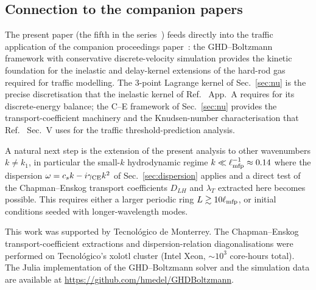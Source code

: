 \documentclass[aps,pre,twocolumn,superscriptaddress,longbibliography,floatfix]{revtex4-2}
\begin{document}
\subsection{Connection to the companion papers}

The present paper (the fifth in the
series~\cite{PaperI,PaperII,PaperIII,PaperIV}) feeds
directly into the traffic application of the companion
proceedings paper~\cite{PaperVI}: the GHD--Boltzmann framework with
conservative discrete-velocity simulation provides the
kinetic foundation for the inelastic and delay-kernel
extensions of the hard-rod gas required for traffic
modelling. The 3-point Lagrange kernel of
Sec.~\ref{sec:nu} is the precise discretisation that the
inelastic kernel of Ref.~\cite{PaperVI} App.~A requires for
its discrete-energy balance; the C--E framework of
Sec.~\ref{sec:nu} provides the transport-coefficient
machinery and the Knudsen-number characterisation that
Ref.~\cite{PaperVI} Sec.~V uses for the traffic
threshold-prediction analysis.

A natural next step is the extension of the present
analysis to other wavenumbers $k\ne k_1$, in particular the
small-$k$ hydrodynamic regime
$k\ll\ell_{\rm mfp}^{-1}\approx 0.14$ where the dispersion
$\omega=c_s k-i\gamma_{\rm CE}k^2$ of
Sec.~\ref{sec:dispersion} applies and a direct test of the
Chapman--Enskog transport coefficients $D_{LH}$ and
$\lambda_T$ extracted here becomes possible. This requires
either a larger periodic ring $L\gtrsim 10\ell_{\rm mfp}$,
or initial conditions seeded with longer-wavelength
modes.

\begin{acknowledgments}
This work was supported by Tecnol\'ogico de Monterrey. The
Chapman--Enskog transport-coefficient extractions and
dispersion-relation diagonalisations were performed on
Tecnol\'ogico's xolotl cluster (Intel Xeon, $\sim 10^3$
core-hours total). The Julia implementation of the
GHD--Boltzmann solver and the simulation data are
available at \url{https://github.com/hmedel/GHDBoltzmann}.
\end{acknowledgments}
\end{document}
